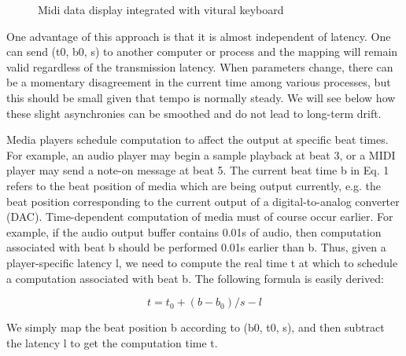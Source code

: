\begin{figure}[H]
\caption{Midi data display integrated with vitural keyboard}
\label{fig:speciation}
\end{figure}

One advantage of this approach is that it is almost independent of latency.
One can send (t0, b0, s) to another computer or process and the mapping will remain
valid regardless of the transmission latency. When parameters change,
there can be a momentary disagreement in the current time among various
processes, but this should be small given that tempo is normally steady. We will see
below how these slight asynchronies can be smoothed and do not lead to long-term
drift.

Media players schedule computation to affect the output at specific beat
times. For example, an audio player may begin a sample playback at beat 3, or a
MIDI player may send a note-on message at beat 5. The current beat time b in Eq. 1
refers to the beat position of media which are being output currently, e.g. the beat
position corresponding to the current output of a digital-to-analog converter (DAC).
Time-dependent computation of media must of course occur earlier. For example, if
the audio output buffer contains 0.01s of audio, then computation associated with
beat b should be performed 0.01s earlier than b. Thus, given a player-specific latency
l, we need to compute the real time t at which to schedule a computation associated
with beat b. The following formula is easily derived:

\begin{equation}
t = t_0 + (b - b_0) / s - l
\end{equation}

We simply map the beat position b according to (b0, t0, s), and then subtract the
latency l to get the computation time t.

